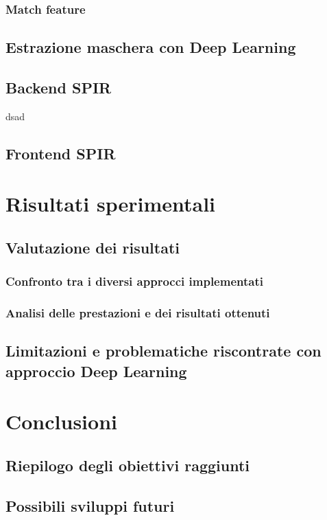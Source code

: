 \documentclass[a4paper,12pt]{report}
\begin{document}
      \subsection{Match feature}

      \newpage
    \section{Estrazione maschera con Deep Learning}
    \section{Backend SPIR}
    dsad
    \section{Frontend SPIR}

\chapter{Risultati sperimentali}
  \section{Valutazione dei risultati}
    \subsection{Confronto tra i diversi approcci implementati}
    \subsection{Analisi delle prestazioni e dei risultati ottenuti}
  \section{Limitazioni e problematiche riscontrate con approccio Deep Learning}

\chapter{Conclusioni}
  \section{Riepilogo degli obiettivi raggiunti}
  \section{Possibili sviluppi futuri}
\end{document}
